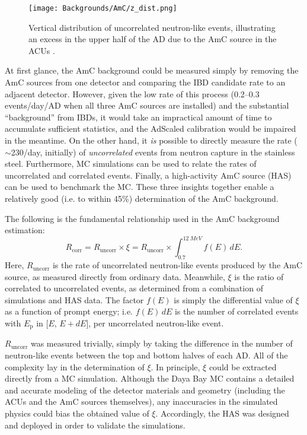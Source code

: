 \documentclass[../thesis.tex]{subfiles}
\begin{document}
\begin{figure}[ht]
  \texttt{[image: Backgrounds/AmC/z\_dist.png]}
  \caption{Vertical distribution of uncorrelated neutron-like events, illustrating an excess in the upper half of the AD due to the AmC source in the ACUs \cite{Gu_2016}.}
  \label{fig:amc_z_dist}
\end{figure}

At first glance, the AmC background could be measured simply by removing the AmC sources from one detector and comparing the IBD candidate rate to an adjacent detector. However, given the low rate of this process (0.2--0.3 events/day/AD when all three AmC sources are installed) and the substantial ``background'' from IBDs, it would take an impractical amount of time to accumulate sufficient statistics, and the AdScaled calibration would be impaired in the meantime. On the other hand, it \emph{is} possible to directly measure the rate ($\sim$230/day, initially) of \emph{uncorrelated} events from neutron capture in the stainless steel. Furthermore, MC simulations can be used to relate the rates of uncorrelated and correlated events. Finally, a high-activity AmC source (HAS) can be used to benchmark the MC. These three insights together enable a relatively good (i.e. to within 45\%) determination of the AmC background.

The following is the fundamental relationship used in the AmC background estimation:
\begin{equation}
  R_{\mathrm{corr}} = R_{\mathrm{uncorr}} \times \xi = R_{\mathrm{uncorr}} \times \int_{0.7}^{\SI{12}{MeV}} f(E)\,dE.
\end{equation}
Here, $R_{\mathrm{uncorr}}$ is the rate of uncorrelated neutron-like events produced by the AmC source, as measured directly from ordinary data. Meanwhile, $\xi$ is the ratio of correlated to uncorrelated events, as determined from a combination of simulations and HAS data. The factor $f(E)$ is simply the differential value of $\xi$ as a function of prompt energy; i.e. $f(E)\,dE$ is the number of correlated events with $E_{\mathrm{p}}$ in [$E$, $E + dE$], per uncorrelated neutron-like event.

$R_{\mathrm{uncorr}}$ was measured trivially, simply by taking the difference in the number of neutron-like events between the top and bottom halves of each AD. All of the complexity lay in the determination of $\xi$. In principle, $\xi$ could be extracted directly from a MC simulation. Although the Daya Bay MC contains a detailed and accurate modeling of the detector materials and geometry (including the ACUs and the AmC sources themselves), any inaccuracies in the simulated physics could bias the obtained value of $\xi$. Accordingly, the HAS was designed and deployed in order to validate the simulations.
\end{document}
